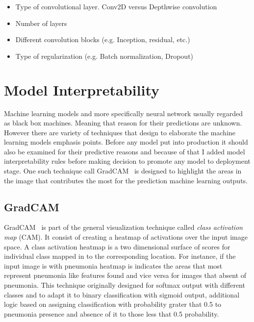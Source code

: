 \begin{itemize}
    \item Type of convolutional layer. Conv2D versus Depthwise convolution
    \item Number of layers
    \item Different convolution blocks (e.g. Inception, residual, etc.)
    \item Type of regularization (e.g. Batch normalization, Dropout)
\end{itemize}

\section{Model Interpretability}
Machine learning models and more specifically neural network usually regarded as black box machines.
Meaning that reason for their predictions are unknown.
However there are variety of techniques that design to elaborate the machine learning models emphasis points.
Before any model put into production it should also be examined for their predictive reasons and because of that I added model interpretability rules before making decision to promote any model to deployment stage.
One such technique call GradCAM~\cite{heatmap} is designed to highlight the areas in the image that contributes the most for the prediction machine learning outputs.

\subsection{GradCAM}
GradCAM~\cite{heatmap} is part of the general visualization technique called \emph{class activation map} (CAM).
It consist of creating a heatmap of activations over the input image space.
A class activation heatmap is a two dimensional surface of scores for individual class mapped in to the corresponding location. For instance, if the input image is with pneumonia heatmap is indicates the areas that most represent pneumonia like features found and vice versa for images that absent of pneumonia.
This technique originally designed for softmax output with different classes and to adapt it to binary classification with sigmoid output, additional logic based on assigning classification with probability grater that 0.5 to pneumonia presence and absence of it to those less that 0.5 probability.

